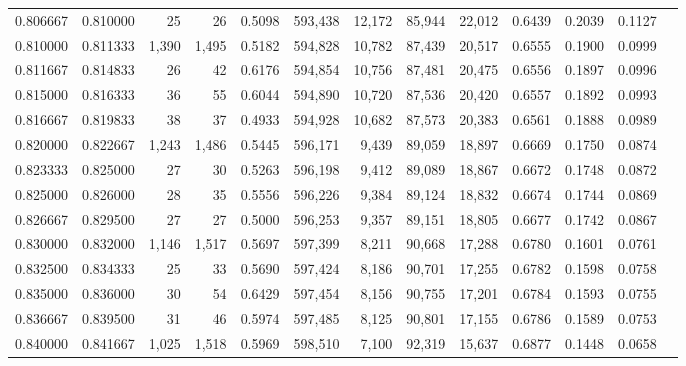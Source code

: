\begin{tabular}{rrrrrrrrrrrrr}
0.806667 & 0.810000 &     25 &    26 &                                     0.5098 & 593,438 &  12,172 &  85,944 &  22,012 & 0.6439 & 0.2039 & 0.1127 \\
0.810000 & 0.811333 &  1,390 & 1,495 &                                     0.5182 & 594,828 &  10,782 &  87,439 &  20,517 & 0.6555 & 0.1900 & 0.0999 \\
0.811667 & 0.814833 &     26 &    42 &                                     0.6176 & 594,854 &  10,756 &  87,481 &  20,475 & 0.6556 & 0.1897 & 0.0996 \\
0.815000 & 0.816333 &     36 &    55 &                                     0.6044 & 594,890 &  10,720 &  87,536 &  20,420 & 0.6557 & 0.1892 & 0.0993 \\
0.816667 & 0.819833 &     38 &    37 &                                     0.4933 & 594,928 &  10,682 &  87,573 &  20,383 & 0.6561 & 0.1888 & 0.0989 \\
0.820000 & 0.822667 &  1,243 & 1,486 &                                     0.5445 & 596,171 &   9,439 &  89,059 &  18,897 & 0.6669 & 0.1750 & 0.0874 \\
0.823333 & 0.825000 &     27 &    30 &                                     0.5263 & 596,198 &   9,412 &  89,089 &  18,867 & 0.6672 & 0.1748 & 0.0872 \\
0.825000 & 0.826000 &     28 &    35 &                                     0.5556 & 596,226 &   9,384 &  89,124 &  18,832 & 0.6674 & 0.1744 & 0.0869 \\
0.826667 & 0.829500 &     27 &    27 &                                     0.5000 & 596,253 &   9,357 &  89,151 &  18,805 & 0.6677 & 0.1742 & 0.0867 \\
0.830000 & 0.832000 &  1,146 & 1,517 &                                     0.5697 & 597,399 &   8,211 &  90,668 &  17,288 & 0.6780 & 0.1601 & 0.0761 \\
0.832500 & 0.834333 &     25 &    33 &                                     0.5690 & 597,424 &   8,186 &  90,701 &  17,255 & 0.6782 & 0.1598 & 0.0758 \\
0.835000 & 0.836000 &     30 &    54 &                                     0.6429 & 597,454 &   8,156 &  90,755 &  17,201 & 0.6784 & 0.1593 & 0.0755 \\
0.836667 & 0.839500 &     31 &    46 &                                     0.5974 & 597,485 &   8,125 &  90,801 &  17,155 & 0.6786 & 0.1589 & 0.0753 \\
0.840000 & 0.841667 &  1,025 & 1,518 &                                     0.5969 & 598,510 &   7,100 &  92,319 &  15,637 & 0.6877 & 0.1448 & 0.0658 \\

\end{tabular}
